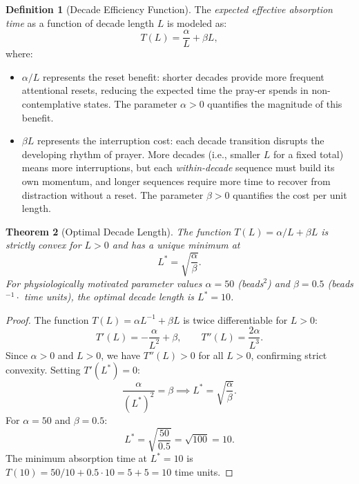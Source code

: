 \documentclass[journal]{IEEEtran}
\newtheorem{theorem}{Theorem}
\theoremstyle{definition}
\newtheorem{definition}[theorem]{Definition}
\theoremstyle{remark}
\begin{document}
\begin{definition}[Decade Efficiency Function]\label{def:efficiency}
The \emph{expected effective absorption time} as a function of decade length $L$ is modeled as:
\begin{equation}\label{eq:TL}
T(L) = \frac{\alpha}{L} + \beta L,
\end{equation}
where:
\begin{itemize}
\item $\alpha/L$ represents the reset benefit: shorter decades provide more frequent attentional resets, reducing the expected time the pray-er spends in non-contemplative states. The parameter $\alpha > 0$ quantifies the magnitude of this benefit.
\item $\beta L$ represents the interruption cost: each decade transition disrupts the developing rhythm of prayer. More decades (i.e., smaller $L$ for a fixed total) means more interruptions, but each \emph{within-decade} sequence must build its own momentum, and longer sequences require more time to recover from distraction without a reset. The parameter $\beta > 0$ quantifies the cost per unit length.
\end{itemize}
\end{definition}

\begin{theorem}[Optimal Decade Length]\label{thm:optimal}
The function $T(L) = \alpha/L + \beta L$ is strictly convex for $L > 0$ and has a unique minimum at
\begin{equation}\label{eq:Lstar}
L^* = \sqrt{\frac{\alpha}{\beta}}.
\end{equation}
For physiologically motivated parameter values $\alpha = 50$ (beads$^2$) and $\beta = 0.5$ (beads$^{-1} \cdot$ time units), the optimal decade length is $L^* = 10$.
\end{theorem}

\begin{proof}
The function $T(L) = \alpha L^{-1} + \beta L$ is twice differentiable for $L > 0$:
\begin{equation}
T'(L) = -\frac{\alpha}{L^2} + \beta, \qquad T''(L) = \frac{2\alpha}{L^3}.
\end{equation}
Since $\alpha > 0$ and $L > 0$, we have $T''(L) > 0$ for all $L > 0$, confirming strict convexity. Setting $T'(L^*) = 0$:
\begin{equation}
\frac{\alpha}{(L^*)^2} = \beta \implies L^* = \sqrt{\frac{\alpha}{\beta}}.
\end{equation}
For $\alpha = 50$ and $\beta = 0.5$:
\begin{equation}
L^* = \sqrt{\frac{50}{0.5}} = \sqrt{100} = 10.
\end{equation}
The minimum absorption time at $L^* = 10$ is $T(10) = 50/10 + 0.5 \cdot 10 = 5 + 5 = 10$ time units.
\end{proof}
\end{document}
